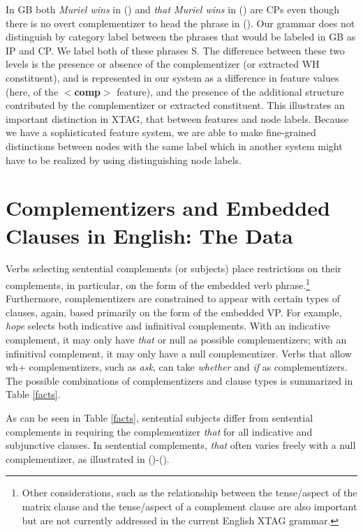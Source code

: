 
 In GB both {\it Muriel wins} in () and {\it that Muriel wins} in
() are CPs even though there is no overt complementizer to head the
phrase in ().  Our grammar does not distinguish by category label
between the phrases that would be labeled in GB as IP and CP.  We label
both of these phrases S.  The difference between these two levels is the
presence or absence of the complementizer (or extracted WH constituent), and is
represented in our system as a difference in feature values (here, of the {\bf
$<$comp$>$} feature), and the presence of the additional structure contributed
by the complementizer or extracted constituent.  This illustrates an important
distinction in XTAG, that between features and node labels.  Because we have a
sophisticated feature system, we are able to make fine-grained distinctions
between nodes with the same label which in another system might have to be
realized by using distinguishing node labels.
 
\section{Complementizers and Embedded Clauses in English:  The
Data}
\label{data}

Verbs selecting sentential complements (or subjects) place restrictions on
their complements, in particular, on the form of the embedded verb
phrase.\footnote{Other considerations, such as the relationship between the
tense/aspect of the matrix clause and the tense/aspect of a complement clause
are also important but are not currently addressed in the current English XTAG
grammar.}  Furthermore, complementizers are constrained to appear with certain
types of clauses, again, based primarily on the form of the embedded VP.  For
example, {\it hope\/} selects both indicative and infinitival complements. With
an indicative complement, it may only have {\it that\/} or null as possible
complementizers; with an infinitival complement, it may only have a null
complementizer.  Verbs that allow wh+ complementizers, such as {\it ask}, can
take {\it whether} and {\it if} as complementizers.  The possible combinations
of complementizers and clause types is summarized in Table \ref{facts}.

As can be seen in Table \ref{facts}, sentential subjects differ from
sentential complements in requiring the complementizer {\it that\/}
for all indicative and subjunctive clauses.  In sentential complements,
{\it that\/} often varies freely with a null complementizer, as
illustrated in ()-().

